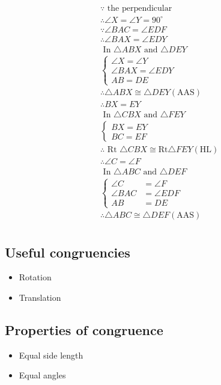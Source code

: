 \documentclass{article}
\begin{document}
$$\begin{aligned}
& \because \text { the perpendicular } \\
& \therefore \angle X=\angle Y=90^{\circ} \\
& \because \angle B A C=\angle E D F \\
& \therefore \angle B A X=\angle E D Y \\
& \text { In } \triangle ABX \text { and } \triangle DEY \\
& \left\{\begin{array}{c}
\angle X=\angle Y \\
\angle BAX=\angle EDY \\
A B=D E
\end{array}\right. \\
& \therefore \triangle ABX \cong \triangle DEY(\mathrm{AAS}) \\
& \therefore B X=E Y\\
& \text { In } \triangle CBX \text { and } \triangle FEY \\
& \left\{\begin{array}{l}
B X=E Y \\
B C=E F
\end{array}\right. \\
& \therefore \text { Rt } \triangle CBX \cong \mathrm{Rt} \triangle FEY(\mathrm{HL}) \\
& \therefore \angle C=\angle F \\
& \text { In } \triangle ABC \text { and } \triangle DEF \\
& \left\{\begin{aligned}
\angle C & =\angle F \\
\angle BAC & =\angle EDF \\
A B & =D E
\end{aligned}\right. \\
& \therefore \triangle ABC \cong \triangle DEF(\mathrm{AAS}) \\
&
\end{aligned}
$$
\pagebreak
\subsection{Useful congruencies}
\begin{itemize}
    \item Rotation
    \item Translation
\end{itemize}

\subsection{Properties of congruence}
\begin{itemize}
    \item Equal side length 
    \item Equal angles
\end{itemize}
\end{document}
